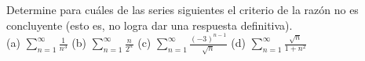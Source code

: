 \item Determine para cuáles de las series siguientes el criterio de la razón no es concluyente (esto es, no logra dar una respuesta definitiva). \\
    (a) $\displaystyle\sum_{n=1}^\infty \frac{1}{n^3}$ \qquad (b) $\displaystyle\sum_{n=1}^\infty \frac{n}{2^n}$ \qquad (c) $\displaystyle\sum_{n=1}^\infty \frac{(-3)^{n-1}}{\sqrt{n}}$ \qquad (d) $\displaystyle\sum_{n=1}^\infty \frac{\sqrt{n}}{1+n^2}$
